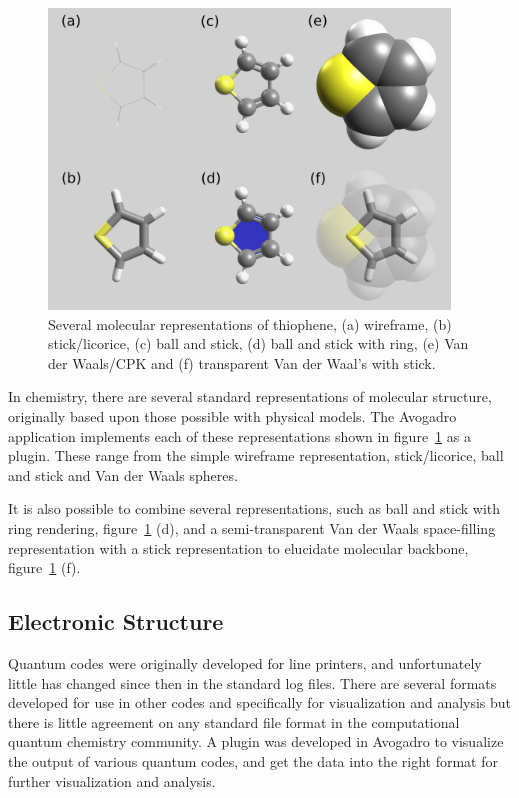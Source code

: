 \documentclass[10pt]{bmc_article}
\newenvironment{bmcformat}{\begin{raggedright}
\baselineskip20pt\sloppy\setboolean{publ}{false}}{\end{raggedright}
\baselineskip20pt\sloppy}
\begin{document}
\begin{bmcformat}
\begin{figure}
  \includegraphics[width=0.95\textwidth]{images/standardRepsLabel}
  \caption{Several molecular representations of thiophene, (a) wireframe,
   (b) stick/licorice, (c) ball and stick, (d) ball and stick with ring,
    (e) Van der Waals/CPK and (f) transparent Van der Waal's with stick.}
 \label{f:standardReps}
\end{figure}

In chemistry, there are several standard representations of molecular structure,
originally based upon those possible with physical models. The Avogadro
application implements each of these representations shown in
figure~\ref{f:standardReps} as a plugin. These range from the simple wireframe
representation, stick/licorice, ball and stick and Van der Waals spheres.

It is also possible to combine several representations, such as ball and stick
with ring rendering, figure~\ref{f:standardReps} (d), and a semi-transparent Van
der Waals space-filling representation with a stick representation to elucidate
molecular backbone, figure~\ref{f:standardReps} (f).

\subsection{Electronic Structure}

Quantum codes were originally developed for line printers, and unfortunately little has
changed since then in the standard log files. There are several formats developed for
use in other codes and specifically for visualization and analysis but there is little
agreement on any standard file format in the computational quantum chemistry
community. A plugin was developed in Avogadro to visualize the output of various
quantum codes, and get the data into the right format for further visualization and
analysis.


\end{bmcformat}
\end{document}
